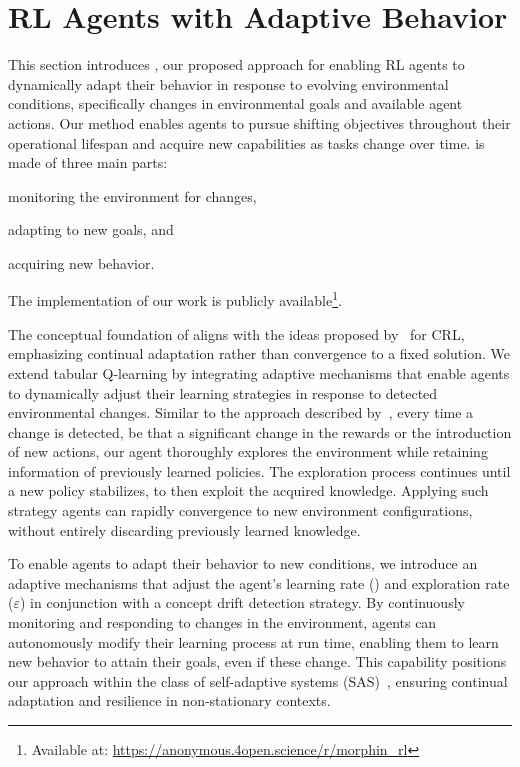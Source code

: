 
\section{\ac{RL} Agents with Adaptive Behavior}
\label{sec:implementation}

This section introduces \adaptiverl, our proposed approach for enabling \ac{RL} agents to dynamically 
adapt their behavior in response to evolving environmental conditions, specifically changes in 
environmental goals and available agent actions. Our method enables agents to pursue shifting 
objectives throughout their operational lifespan and acquire new capabilities as tasks change over 
time. \adaptiverl is made of three main parts:
\begin{enumerate*}[label=(\arabic*)]
\item monitoring the environment for changes,
\item adapting to new goals, and
\item acquiring new behavior.
\end{enumerate*}
The implementation of our work is publicly available\footnote{Available at: \url{https://anonymous.4open.science/r/morphin_rl}}.

The conceptual foundation of \adaptiverl aligns with the ideas proposed 
by~\citet{abel2023definitioncontinualreinforcementlearning} for \ac{CRL}, emphasizing continual 
adaptation rather than convergence to a fixed solution. We extend tabular Q-learning by integrating 
adaptive mechanisms that enable agents to dynamically adjust their learning strategies in response 
to detected environmental changes. Similar to the approach described 
by~\citet{norman2024firstexploreexploitmetalearningsolve}, every time a change is detected, be that 
a significant change in the rewards or the introduction of new actions, our agent thoroughly explores 
the environment while retaining information of previously learned policies. The exploration process 
continues until a new policy stabilizes, to then exploit the acquired knowledge. Applying such strategy 
agents can rapidly convergence to new environment configurations, without entirely discarding 
previously learned knowledge.

To enable agents to adapt their behavior to new conditions, we introduce an adaptive mechanisms 
that adjust the agent's learning rate (\lrate{\alpha}) and exploration rate ($\varepsilon$) in conjunction 
with a concept drift detection strategy. By continuously monitoring and responding to changes in the 
environment, agents can autonomously modify their learning process at run time, enabling them 
to learn new behavior to attain their goals, even if these change. This capability positions our approach 
within the class of self-adaptive systems (SAS)~\cite{sasreview}, ensuring continual adaptation and 
resilience in non-stationary contexts.

